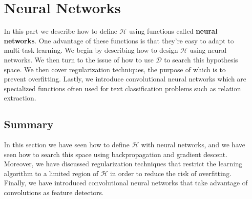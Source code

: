 \chapter{Neural Networks}
\label{neural_networks}

In this part we describe how to define $\mathcal{H}$ using functions called \textbf{neural networks}. One advantage of these functions is that they're easy to adapt to multi-task learning. We begin by describing how to design $\mathcal{H}$ using neural networks. We then turn to the issue of how to use $\mathcal{D}$ to search this hypothesis space. We then cover regularization techniques, the purpose of which is to prevent overfitting. Lastly, we introduce convolutional neural networks which are specialized functions often used for text classification problems such as relation extraction.





\section{Summary}
In this section we have seen how to define $\mathcal{H}$ with neural networks, and we have seen how to search this space using backpropagation and gradient descent. Moreover, we have discussed regularization techniques that restrict the learning algorithm to a limited region of $\mathcal{H}$ in order to reduce the risk of overfitting. Finally, we have introduced convolutional neural networks that take advantage of convolutions as feature detectors.